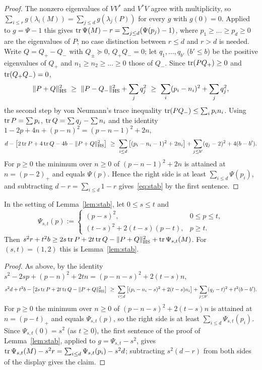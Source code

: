 \begin{proof}
The nonzero eigenvalues of $VV^*$ and $V^*V$ agree with multiplicity, so $\sum_{i\le r}g(\lambda_i(M))=\sum_{j\le d}g(\lambda_j(P))$ for every $g$
with $g(0)=0$. Applied to $g=\Psi-1$ this gives $\operatorname{tr}\Psi(M)-r=\sum_{j\le d}(\Psi(p_j)-1)$, where $p_1\ge\dots\ge p_d\ge0$ are the eigenvalues of
$P$; no case distinction between $r\le d$ and $r>d$ is needed. Write $Q=Q_+-Q_-$ with $Q_\pm\succeq0$, $Q_+Q_-=0$; let $q_1,\dots,q_{b'}$
($b'\le b$) be the positive eigenvalues of $Q_+$ and $n_1\ge n_2\ge\dots\ge0$ those of $Q_-$. Since $\operatorname{tr}(PQ_+)\ge0$ and $\operatorname{tr}(Q_+Q_-)=0$,
\[
\HS{P+Q}^2\ \ge\ \HS{P-Q_-}^2+\sum_jq_j^2\ \ge\ \sum_i(p_i-n_i)^2+\sum_jq_j^2,
\]
the second step by von Neumann's trace inequality $\operatorname{tr}(PQ_-)\le\sum_ip_in_i$. Using $\operatorname{tr} P=\sum p_i$, $\operatorname{tr} Q=\sum q_j-\sum n_i$ and the identity
$1-2p+4n+(p-n)^2=(p-n-1)^2+2n$,
\[
d-\big[2\tr P+4\tr Q-4b-\HS{P+Q}^2\big]\ \ge\ \sum_{i\le d}\big[(p_i-n_i-1)^2+2n_i\big]+\sum_{j\le b'}(q_j-2)^2+4(b-b').
\]
For $p\ge0$ the minimum over $n\ge0$ of $(p-n-1)^2+2n$ is attained at $n=(p-2)_+$ and equals $\Psi(p)$. Hence the right side is at least
$\sum_{i\le d}\Psi(p_i)$, and subtracting $d-r=\sum_{i\le d}1-r$ gives~\eqref{eq:stab} by the first sentence.
\end{proof}

\begin{lemma}\label{lem:Ast}
In the setting of Lemma~\ref{lem:stab}, let $0\le s\le t$ and
\[
\Psi_{s,t}(p):=\begin{cases}(p-s)^2,&0\le p\le t,\\ (t-s)^2+2(t-s)(p-t),&p\ge t.\end{cases}
\]
Then $s^2r+t^2b\ge2s\operatorname{tr} P+2t\operatorname{tr} Q-\lVert P+Q\rVert_{\mathrm{HS}}^2+\operatorname{tr}\Psi_{s,t}(M)$. For $(s,t)=(1,2)$ this is Lemma~\ref{lem:stab}.
\end{lemma}

\begin{proof}
As above, by the identity $s^2-2sp+(p-n)^2+2tn=(p-n-s)^2+2(t-s)n$,
\[
s^2d+t^2b-\big[2s\operatorname{tr} P+2t\operatorname{tr} Q-\lVert P+Q\rVert_{\mathrm{HS}}^2\big]\ \ge\ \sum_{i\le d}\big[(p_i-n_i-s)^2+2(t-s)n_i\big]+\sum_{j\le b'}(q_j-t)^2+t^2(b-b').
\]
For $p\ge0$ the minimum over $n\ge0$ of $(p-n-s)^2+2(t-s)n$ is attained at $n=(p-t)_+$ and equals $\Psi_{s,t}(p)$, so the right side is at
least $\sum_{i\le d}\Psi_{s,t}(p_i)$. Since $\Psi_{s,t}(0)=s^2$ (as $t\ge0$), the first sentence of the proof of Lemma~\ref{lem:stab},
applied to $g=\Psi_{s,t}-s^2$, gives $\operatorname{tr}\Psi_{s,t}(M)-s^2r=\sum_{i\le d}\Psi_{s,t}(p_i)-s^2d$; subtracting $s^2(d-r)$ from both sides of
the display gives the claim.
\end{proof}

